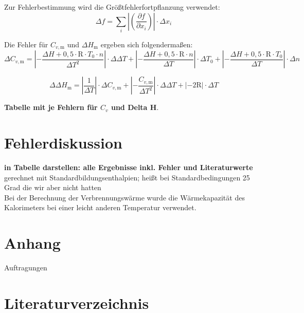 \documentclass[12pt,a4paper,titlepage,headinclude,bibtotoc]{scrartcl}
\begin{document}
Zur Fehlerbestimmung wird die Größtfehlerfortpflanzung verwendet:\\

\begin{equation}
\Delta f=\sum_i \left| \left(\frac{\partial f}{\partial x_i}\right)\right| \cdot \Delta x_i
\end{equation}

Die Fehler für $C_{v,\mathrm{m}}$ und $\Delta H_\mathrm{m}$ ergeben sich folgendermaßen:\\

\begin{equation}
\Delta C_{v,\mathrm{m}}= \left|-\frac{\Delta H+0,5 \cdot \mathrm{R}\cdot T_0 \cdot n}{\Delta T^2}\right|\cdot \Delta \Delta T + \left|-\frac{\Delta H+0,5 \cdot \mathrm{R} \cdot n}{\Delta T}\right| \cdot \Delta T_0+ \left|-\frac{\Delta H+0,5 \cdot \mathrm{R}\cdot T_0}{\Delta T}\right|\cdot \Delta n
\end{equation}

\begin{equation}
\Delta \Delta H_\mathrm{m}= \left|\frac{1}{\Delta T}\right| \cdot \Delta C_{v,\mathrm{m}}+ \left|-\frac{C_{v,\mathrm{m}}}{\Delta T^2}\right|\cdot \Delta \Delta T+\left|-2\mathrm{R}\right| \cdot \Delta T
\end{equation}

\textbf{Tabelle mit je Fehlern für $C_v$ und Delta H}.\\

\section{Fehlerdiskussion}
\textbf{in Tabelle darstellen: alle Ergebnisse inkl. Fehler und Literaturwerte}\\

gerechnet mit Standardbildungsenthalpien; heißt bei Standardbedingungen 25 Grad die wir aber nicht hatten\\

Bei der Berechnung der Verbrennungswärme wurde die Wärmekapazität des Kalorimeters bei einer leicht anderen Temperatur verwendet.\\

\section{Anhang}
Auftragungen


\section{Literaturverzeichnis}
\end{document}

